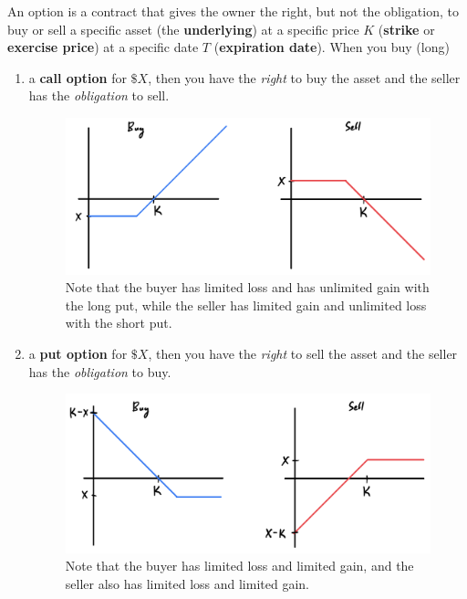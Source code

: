 \documentclass{article}
\begin{document}
  \begin{definition}
    An option is a contract that gives the owner the right, but not the obligation, to buy or sell a specific asset (the \textbf{underlying}) at a specific price $K$ (\textbf{strike} or \textbf{exercise price}) at a specific date $T$ (\textbf{expiration date}). When you buy (long) 
    \begin{enumerate}
      \item a \textbf{call option} for $\$X$, then you have the \textit{right} to buy the asset and the seller has the \textit{obligation} to sell. 
      \begin{figure}[H]
        \centering 
        \includegraphics[scale=0.4]{img/call_options.png}
        \caption{Note that the buyer has limited loss and has unlimited gain with the long put, while the seller has limited gain and unlimited loss with the short put.} 
        \label{fig:call_options}
      \end{figure}
      \item a \textbf{put option} for $\$X$, then you have the \textit{right} to sell the asset and the seller has the \textit{obligation} to buy. 
      \begin{figure}[H]
        \centering 
        \includegraphics[scale=0.4]{img/put_options.png}
        \caption{Note that the buyer has limited loss and limited gain, and the seller also has limited loss and limited gain. } 

\end{figure}
\end{enumerate}
\end{definition}
\end{document}
